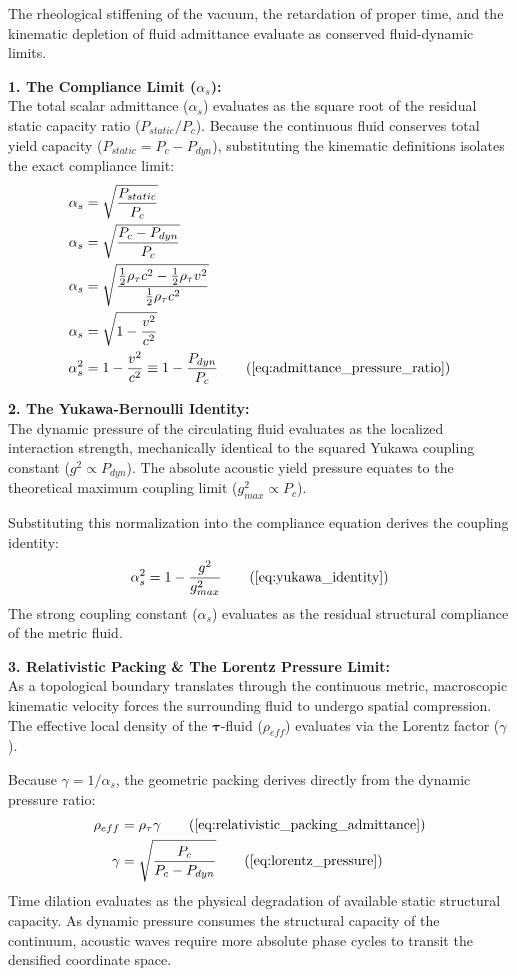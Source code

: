 \documentclass[11pt, a4paper]{article}
\begin{document}
The rheological stiffening of the vacuum, the retardation of proper time, and the kinematic depletion of fluid admittance evaluate as conserved fluid-dynamic limits.

\textbf{1. The Compliance Limit ($\alpha_s$):} \\
The total scalar admittance ($\alpha_s$) evaluates as the square root of the residual static capacity ratio ($P_{static} / P_c$). Because the continuous fluid conserves total yield capacity ($P_{static} = P_c - P_{dyn}$), substituting the kinematic definitions isolates the exact compliance limit:
\begin{align}
    \alpha_s &= \sqrt{\frac{P_{static}}{P_c}} \nonumber \\
    \alpha_s &= \sqrt{\frac{P_c - P_{dyn}}{P_c}} \nonumber \\
    \alpha_s &= \sqrt{\frac{\frac{1}{2}\rho_{\tau} c^2 - \frac{1}{2}\rho_{\tau} v^2}{\frac{1}{2}\rho_{\tau} c^2}} \nonumber \\
    \alpha_s &= \sqrt{1 - \frac{v^2}{c^2}} \nonumber \\
    \alpha_s^2 &= 1 - \frac{v^2}{c^2} \equiv 1 - \frac{P_{dyn}}{P_c} \tag{\ref{eq:admittance_pressure_ratio}}
\end{align}

\textbf{2. The Yukawa-Bernoulli Identity:} \\
The dynamic pressure of the circulating fluid evaluates as the localized interaction strength, mechanically identical to the squared Yukawa coupling constant ($g^2 \propto P_{dyn}$). The absolute acoustic yield pressure equates to the theoretical maximum coupling limit ($g_{max}^2 \propto P_c$).

Substituting this normalization into the compliance equation derives the coupling identity:
\begin{equation}
    \alpha_s^2 = 1 - \frac{g^2}{g_{max}^2} \tag{\ref{eq:yukawa_identity}}
\end{equation}
The strong coupling constant ($\alpha_s$) evaluates as the residual structural compliance of the metric fluid.

\textbf{3. Relativistic Packing \& The Lorentz Pressure Limit:} \\
As a topological boundary translates through the continuous metric, macroscopic kinematic velocity forces the surrounding fluid to undergo spatial compression. The effective local density of the $\boldsymbol{\tau}$-fluid ($\rho_{eff}$) evaluates via the Lorentz factor ($\gamma$).

Because $\gamma = 1/\alpha_s$, the geometric packing derives directly from the dynamic pressure ratio:
\begin{align}
    \rho_{eff} &= \rho_{\tau} \gamma \tag{\ref{eq:relativistic_packing_admittance}} \\
    \gamma &= \sqrt{\frac{P_c}{P_c - P_{dyn}}} \tag{\ref{eq:lorentz_pressure}}
\end{align}
Time dilation evaluates as the physical degradation of available static structural capacity. As dynamic pressure consumes the structural capacity of the continuum, acoustic waves require more absolute phase cycles to transit the densified coordinate space.
\end{document}
